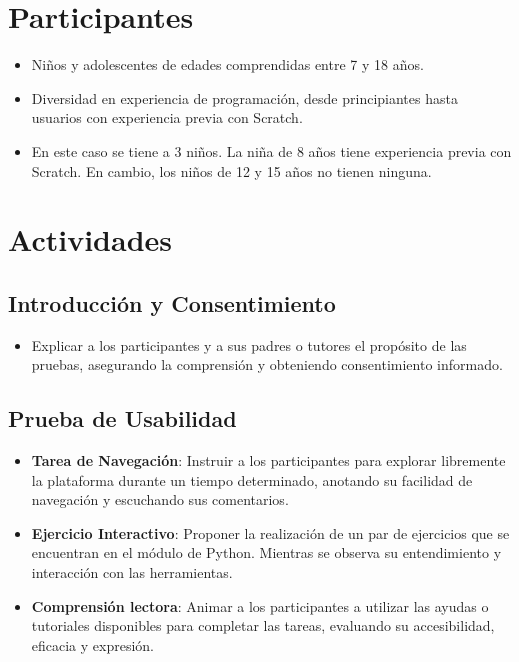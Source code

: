 \begin{appendices}
\section{Participantes}
\begin{itemize}
    \item Niños y adolescentes de edades comprendidas entre 7 y 18 años.
    \item Diversidad en experiencia de programación, desde principiantes hasta usuarios con experiencia previa con Scratch.
    \item En este caso se tiene a 3 niños. La niña de 8 años tiene experiencia previa con Scratch. En cambio, los niños de 12 y 15 años no tienen ninguna. 
\end{itemize}

\section{Actividades}
\subsection*{Introducción y Consentimiento}
\begin{itemize}
    \item Explicar a los participantes y a sus padres o tutores el propósito de las pruebas, asegurando la comprensión y obteniendo consentimiento informado.
\end{itemize}

\subsection*{Prueba de Usabilidad}
\begin{itemize}
    \item \textbf{Tarea de Navegación}: Instruir a los participantes para explorar libremente la plataforma durante un tiempo determinado, anotando su facilidad de navegación y escuchando sus comentarios.
    \item \textbf{Ejercicio Interactivo}: Proponer la realización de un par de ejercicios que se encuentran en el módulo de Python. Mientras se observa su entendimiento y interacción con las herramientas.
    \item \textbf{Comprensión lectora}: Animar a los participantes a utilizar las ayudas o tutoriales disponibles para completar las tareas, evaluando su accesibilidad, eficacia y expresión.
\end{itemize}


\end{appendices}
